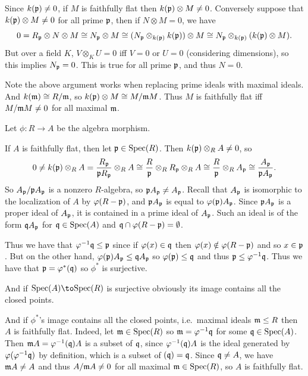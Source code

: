     Since $k({{\frak p}})\neq0$, if $M$ is faithfully flat then $k({{\frak p}})\otimes M\neq0$.
    Conversely suppose that $k({{\frak p}})\otimes M\neq0$ for all prime ${{\frak p}}$, then if $N\otimes M=0$, we have
    $$ 0 = R_{{\frak p}} \otimes N \otimes M \cong N_{{\frak p}} \otimes M \cong (N_{{\frak p}} \otimes_{k({{\frak p}})} k({{\frak p}})) \otimes M \cong N_{{\frak p}} \otimes_{k({{\frak p}})} (k({{\frak p}}) \otimes M) . $$
    But over a field $K$, $V\otimes_KU=0$ iff $V=0$ or $U=0$ (considering dimensions), so this implies $N_{{\frak p}}=0$.
    This is true for all prime ${{\frak p}}$, and thus $N=0$.

    Note the above argument works when replacing prime ideals with maximal ideals.
    And $k({{\frak m}})\cong R/{{\frak m}}$, so $k({{\frak p}})\otimes M\cong M/{{\frak m}} M$.
    Thus $M$ is faithfully flat iff $M/{{\frak m}} M\neq0$ for all maximal ${{\frak m}}$.

    \item Let $\phi\colon R\to A$ be the algebra morphism.

    If $A$ is faithfully flat, then let ${{\frak p}}\in{\rm Spec}(R)$.
    Then $k({{\frak p}})\otimes_RA\neq0$, so
    $$ 0 \neq k({{\frak p}}) \otimes_R A = {{R_{{\frak p}}}\over{{{\frak p}}R_{{\frak p}}}} \otimes_R A \cong {{R}\over{{{\frak p}}}} \otimes_R R_{{\frak p}} \otimes_R A \cong {{R}\over{{{\frak p}}}} \otimes_R A_{{\frak p}} \cong {{A_{{\frak p}}}\over{{{\frak p}}A_{{\frak p}}}} . $$
    So $A_{{\frak p}}/{{\frak p}} A_{{\frak p}}$ is a nonzero $R$-algebra, so ${{\frak p}} A_{{\frak p}}\neq A_{{\frak p}}$.
    Recall that $A_{{\frak p}}$ is isomorphic to the localization of $A$ by $\varphi(R-{{\frak p}})$, and ${{\frak p}} A_{{\frak p}}$ is equal to $\varphi({{\frak p}})A_{{\frak p}}$.
    Since ${{\frak p}} A_{{\frak p}}$ is a proper ideal of $A_{{\frak p}}$, it is contained in a prime ideal of $A_{{\frak p}}$.
    Such an ideal is of the form ${{\frak q}} A_{{\frak p}}$ for ${{\frak q}}\in{\rm Spec}(A)$ and ${{\frak q}}\cap\varphi(R-{{\frak p}})=\emptyset$.

    Thus we have that $\varphi^{-1}{{\frak q}}\leq{{\frak p}}$ since if $\varphi(x)\in{{\frak q}}$ then $\varphi(x)\notin\varphi(R-{{\frak p}})$ and so $x\in{{\frak p}}$.
    But on the other hand, $\varphi({{\frak p}})A_{{\frak p}}\leq{{\frak q}} A_{{\frak p}}$ so $\varphi({{\frak p}})\leq{{\frak q}}$ and thus ${{\frak p}}\leq\varphi^{-1}{{\frak q}}$.
    Thus we have that ${{\frak p}}=\varphi^*({{\frak q}})$ so $\phi^*$ is surjective.

    And if $\spec(A)\to\spec(R)$ is surjective obviously its image contains all the closed points.

    And if $\phi^*$'s image contains all the closed points, i.e.\ maximal ideals ${{\frak m}}\leq R$ then $A$ is faithfully flat.
    Indeed, let ${{\frak m}}\in{\rm Spec}(R)$ so ${{\frak m}}=\varphi^{-1}{{\frak q}}$ for some ${{\frak q}}\in{\rm Spec}(A)$.
    Then ${{\frak m}} A=\varphi^{-1}({{\frak q}})A$ is a subset of ${{\frak q}}$, since $\varphi^{-1}({{\frak q}})A$ is the ideal generated by $\varphi(\varphi^{-1}{{\frak q}})$ by definition, which is a subset of $({{\frak q}})={{\frak q}}$.
    Since ${{\frak q}}\neq A$, we have ${{\frak m}} A\neq A$ and thus $A/{{\frak m}} A\neq0$ for all maximal ${{\frak m}}\in{\rm Spec}(R)$, so $A$ is faithfully flat.

